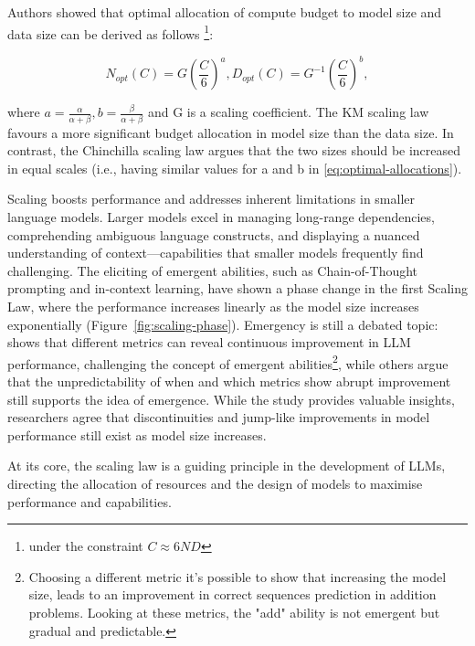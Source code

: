 \begin{enumerate}
{		      Authors showed that optimal allocation of compute budget to model size and data size can be derived as follows \footnote{under the constraint \(C \approx 6ND\)}:

		      \begin{center}
			      \begin{equation}
				      N_{opt}(C) = G(\frac{C}{6})^a, D_{opt}(C) = G^{-1}(\frac{C}{6})^b, \label{eq:optimal-allocations}
			      \end{equation}
		      \end{center}

		      \noindent where $a=\frac{\alpha}{\alpha+\beta}, b=\frac{\beta}{\alpha+\beta}$ and G is a scaling coefficient.
		      The KM scaling law favours a more significant budget allocation in model size than the data size. In contrast, the Chinchilla scaling law argues that the two sizes should be increased in equal scales \cite{hoffmann2022training} (i.e., having similar values for a and b in \eqref{eq:optimal-allocations}).
	      }
\end{enumerate}

Scaling boosts performance and addresses inherent limitations in smaller language models.
Larger models excel in managing long-range dependencies, comprehending ambiguous language constructs, and displaying a nuanced understanding of context---capabilities that smaller models frequently find challenging.
The eliciting of emergent abilities, such as Chain-of-Thought prompting and in-context learning, have shown a phase change in the first Scaling Law, where the performance increases linearly as the model size increases exponentially (Figure~\ref{fig:scaling-phase}).
Emergency is still a debated topic: \textcite{schaeffer2023emergentabilitieslargelanguage} shows that different metrics can reveal continuous improvement in LLM performance, challenging the concept of emergent abilities\footnote{Choosing a different metric it's possible to show that increasing the model size, leads to an improvement in correct sequences prediction in addition problems. Looking at these metrics, the "add" ability is not emergent but gradual and predictable.}, while others argue that the unpredictability of when and which metrics show abrupt improvement still supports the idea of emergence.
While the study provides valuable insights, researchers agree that discontinuities and jump-like improvements in model performance still exist as model size increases.

At its core, the scaling law is a guiding principle in the development of LLMs, directing the allocation of resources and the design of models to maximise performance and capabilities.


